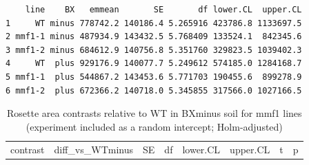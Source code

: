 \documentclass[
  10pt,
]{article}
\begin{document}
\begin{verbatim}
    line    BX   emmean       SE       df lower.CL  upper.CL
1     WT minus 778742.2 140186.4 5.265916 423786.8 1133697.5
2 mmf1-1 minus 487934.9 143432.5 5.768409 133524.1  842345.6
3 mmf1-2 minus 684612.9 140756.8 5.351760 329823.5 1039402.3
4     WT  plus 929176.9 140077.7 5.249612 574185.0 1284168.7
5 mmf1-1  plus 544867.2 143453.6 5.771703 190455.6  899278.9
6 mmf1-2  plus 672366.2 140718.0 5.345855 317566.0 1027166.5
\end{verbatim}

\begin{longtable}[]{@{}
  >{\raggedright\arraybackslash}p{}
  >{\raggedleft\arraybackslash}p{}
  >{\raggedleft\arraybackslash}p{}
  >{\raggedleft\arraybackslash}p{}
  >{\raggedleft\arraybackslash}p{}
  >{\raggedleft\arraybackslash}p{}
  >{\raggedleft\arraybackslash}p{}
  >{\raggedleft\arraybackslash}p{}@{}}
\caption{Rosette area contrasts relative to WT in BXminus soil for mmf1
lines (experiment included as a random intercept;
Holm-adjusted)}\tabularnewline
\toprule\noalign{}
\begin{minipage}[b]{\linewidth}\raggedright
contrast
\end{minipage} & \begin{minipage}[b]{\linewidth}\raggedleft
diff\_vs\_WTminus
\end{minipage} & \begin{minipage}[b]{\linewidth}\raggedleft
SE
\end{minipage} & \begin{minipage}[b]{\linewidth}\raggedleft
df
\end{minipage} & \begin{minipage}[b]{\linewidth}\raggedleft
lower.CL
\end{minipage} & \begin{minipage}[b]{\linewidth}\raggedleft
upper.CL
\end{minipage} & \begin{minipage}[b]{\linewidth}\raggedleft
t
\end{minipage} & \begin{minipage}[b]{\linewidth}\raggedleft
p
\end{minipage} \\

\end{longtable}
\end{document}
